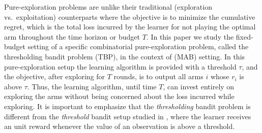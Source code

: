%
%
Pure-exploration problems are unlike their traditional (exploration vs.\ exploitation) counterparts where the  objective is to minimize the cumulative regret, which is the total loss incurred by the learner for not playing the optimal arm throughout the time horizon or budget $T$. In this paper we study the fixed-budget setting of a specific combinatorial pure-exploration problem, called the thresholding bandit problem (TBP), in the context of (MAB) setting. In this pure-exploration setup the learning algorithm is provided with a threshold $\tau$, and the objective, after exploring for $T$ rounds, is to  output all arms $i$ whose $r_{i}$ is above $\tau$. Thus, the learning algorithm, until time $T$, can invest entirely on exploring the arms  without being concerned about the loss incurred while exploring. It is important to emphasize that the \emph{thresholding} bandit problem is different from the \emph{threshold} bandit setup studied in \cite{abernethy2016threshold}, where the learner receives an unit reward whenever the value of an observation is above a threshold. 



